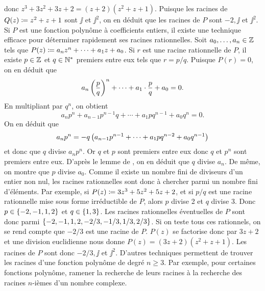 \documentclass{magnoliaold}
\begin{document}
\begin{remarques}
  \noindent donc $z^3+3z^2+3z+2=(z+2)(z^2+z+1)$. Puisque les racines de $Q(z)\coloneqq z^2+z+1$ sont $\jj$ et
  $\jj^2$, on en déduit que les racines de $P$ sont $-2,\jj$ et $\jj^2$.
  \remarque
  Si $P$ est une fonction polynôme à coefficients entiers, il existe une technique efficace pour déterminer rapidement
  ses racines rationnelles. Soit $a_0,\ldots,a_n\in\mathbb{Z}$ tels que $P(z)\coloneqq a_n z^n+\cdots+a_1 z+a_0$.
  Si $r$ est une racine rationnelle de $P$, il existe $p\in\mathbb{Z}$ et $q\in{\mathbb{N}^*}$ premiers entre eux tels que
  $r=p/q$. Puisque $P(r)=0$, on en déduit que
  \[a_n\left(\frac{p}{q}\right)^n+\cdots+a_1\cdot\frac{p}{q}+a_0=0.\]
  En multipliant par $q^n$, on obtient
  \[a_n p^n + a_{n-1}p^{n-1}q+\cdots+a_1 p q^{n-1}+a_0 q^n=0.\]
  On en déduit que
  \[a_n p^n = -q\left(a_{n-1}p^{n-1}+\cdots+a_1 p q^{n-2}+a_0 q^{n-1}\right)\]
  et donc que $q$ divise $a_n p^n$. Or $q$ et $p$ sont premiers entre eux donc $q$ et $p^n$ sont premiers entre eux. D'après le lemme de , on en déduit que $q$ divise $a_n$. De même, on montre que $p$ divise $a_0$. Comme il existe un nombre fini de diviseurs d'un entier non nul, les racines rationnelles sont donc à chercher parmi un nombre fini d'éléments. Par exemple, si $P(z)\coloneqq 3z^3+5z^2+5z+2$, et si $p/q$ est une racine rationnelle mise sous forme irréductible de $P$, alors $p$ divise 2 et $q$ divise 3. Donc $p\in\left\{-2,-1,1,2\right\}$ et $q\in\left\{1, 3\right\}$. Les racines rationnelles éventuelles de $P$ sont donc parmi $\left\{-2,-1,1,2,-2/3,-1/3,1/3,2/3\right\}$. Si on teste tous ces rationnels, on se rend compte que $-2/3$ est une racine de $P$. $P(z)$ se factorise donc par $3z+2$ et une division euclidienne nous donne $P(z)=(3z+2)(z^2+z+1)$. Les racines de $P$ sont donc $-2/3,\jj$ et $\jj^2$.
  \remarque D'autres techniques permettent de trouver les racines d'une fonction polynôme de degré $n\geq 3$. Par exemple, pour certaines fonctions polynôme, ramener la recherche de leurs racines à la recherche des racines $n$-ièmes d'un nombre complexe.
  \end{remarques}
  
  
  
\end{document}
